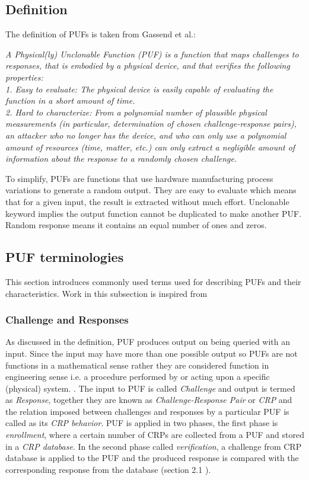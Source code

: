 \subsection{Definition}
The definition of PUFs is taken from Gassend et al.\cite{21}:

\emph{A Physical(ly) Unclonable Function (PUF) is a function that maps challenges to responses, that is embodied by a physical device, and that verifies the following properties:\\
1. Easy to evaluate: The physical device is easily capable of evaluating the function in a short amount of time.\\
2. Hard to characterize: From a polynomial number of plausible physical measurements (in particular, determination of chosen challenge-response pairs), an attacker who no longer has the device, and who can only use a polynomial amount of resources (time, matter, etc.) can only extract a negligible amount of information about the response to a randomly chosen challenge.\\}

To simplify, PUFs are functions that use hardware manufacturing process variations to generate a random output. They are easy to evaluate which means that for a given input, the result is extracted without much effort. Unclonable keyword implies the output function cannot be duplicated to make another PUF. Random response means it contains an equal number of ones and zeros.

\subsection{PUF terminologies}
This section introduces commonly used terms used for describing PUFs and their characteristics. Work in this subsection is inspired from \cite{thbook}

\subsubsection{Challenge and Responses}
As discussed in the definition, PUF produces output on being queried with an input. Since the input may have more than one possible output so PUFs are not functions in a mathematical sense rather they are considered function in engineering sense i.e. a procedure performed by or acting upon a specific (physical) system. \cite{thbook}. The input to PUF is called \emph{Challenge} and output is termed as \emph{Response}, together they are known as \emph{Challenge-Response Pair} or \emph{CRP} and
the relation imposed between challenges and responses by a particular PUF is called as its \emph{CRP behavior}. PUF is applied in two phases, the first phase is \emph{enrollment}, where a certain number of CRPs are collected from a PUF and stored in a \emph{CRP database}. In the second phase called \emph{verification}, a challenge from CRP database is applied to the PUF and the produced response is compared with the corresponding response from the database (section 2.1 \cite{thbook}).

